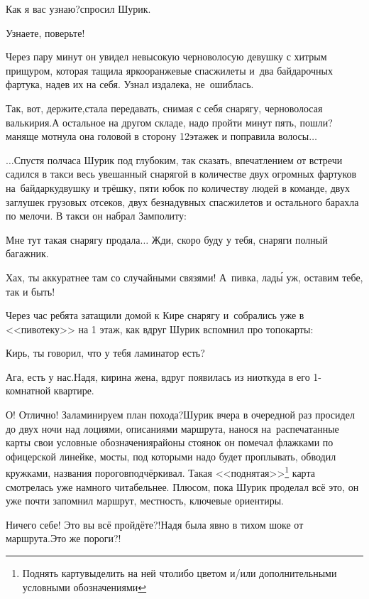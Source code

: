 \diagdash Как я вас узнаю?\mdash спросил Шурик.

\diagdash Узнаете, поверьте!

Через пару минут он увидел невысокую черноволосую девушку с хитрым прищуром, которая тащила ярко\sdash оранжевые спасжилеты и~два байдарочных фартука, надев их на себя. Узнал издалека, не~ошиблась.

\diagdash Так, вот, держите,\mdash стала передавать, снимая с себя снарягу, черноволосая валькирия.\mdash А остальное на другом складе, надо пройти минут пять, пошли?\mdash маняще мотнула она головой в сторону 12\sdash этажек и поправила волосы$\ldots$

\vspace{0.5cm}
$\ldots$Спустя полчаса Шурик под глубоким, так сказать, впечатлением от встречи садился в такси весь увешанный снарягой в количестве двух огромных фартуков на~байдарку\sdash двушку и трёшку, пяти юбок по количеству людей в команде, двух заглушек грузовых отсеков, двух безнадувных спасжилетов и остального барахла по мелочи. В такси он набрал Замполиту:

\diagdash Мне тут такая снарягу продала$\ldots$ Жди, скоро буду у тебя, снаряги полный багажник.

\diagdash Хах, ты аккуратнее там со случайными связями! А~пивка, лад\'{ы} уж, оставим тебе, так и быть!

Через час ребята затащили домой к Кире снарягу и~собрались уже в <<пивотеку>> на 1 этаж, как вдруг Шурик вспомнил про топокарты:

\diagdash Кирь, ты говорил, что у тебя ламинатор есть?

\diagdash Ага, есть у нас.\mdash Надя, кирина жена, вдруг появилась из ниоткуда в его 1-комнатной квартире.

\renewcommand*{\thefootnote}{\fnsymbol{footnote}}
\diagdash О! Отлично! Заламинируем план похода?\mdash Шурик вчера в очередной раз просидел до двух ночи над лоциями, описаниями маршрута, нанося на~распечатанные карты свои условные обозначения\mdash районы стоянок он помечал флажками по офицерской линейке, мосты, под которыми надо будет проплывать, обводил кружками, названия порогов\mdash подчёркивал. Такая <<поднятая>>\footnote[1]{Поднять карту\mdash выделить на ней что\sdash либо цветом и/или дополнительными условными обозначениями} карта смотрелась уже намного читабельнее. Плюсом, пока Шурик проделал всё это, он уже почти запомнил маршрут, местность, ключевые ориентиры.

\diagdash Ничего себе! Это вы всё пройдёте?!\mdash Надя была явно в тихом шоке от маршрута.\mdash Это же пороги?!

